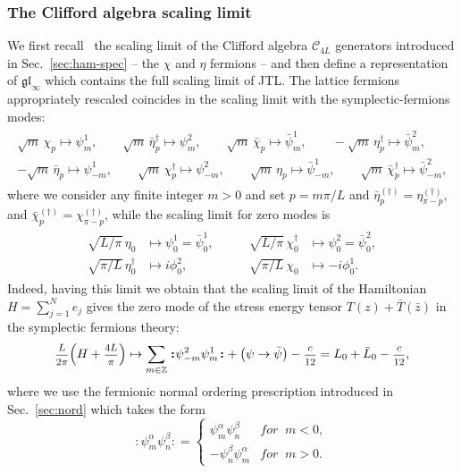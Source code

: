 \documentclass[11pt]{article}
\newcommand{\ffrac}[2]{\mbox{\footnotesize$\displaystyle\frac{#1}{#2}$}}
\newcommand{\bbeta}{\bar{\eta}}
\newcommand{\bbchi}{\bar{\chi}}
\newcommand{\sferm}{\psi}
\newcommand{\sfermp}{\psi^{2}}
\newcommand{\sfermm}{\psi^{1}}
\newcommand{\bsfermp}{\bar{\psi}^{2}}
\newcommand{\bsfermm}{\bar{\psi}^{1}}
\newcommand{\phip}{\phi^{2}}
\newcommand{\phim}{\phi^{1}}
\newcommand{\oZ}{\mathbb{Z}}
\newcommand{\Clif}[1]{\mathscr{C}_{#1}}
\newcommand{\glinf}{\gl_{\infty}}
\newcommand{\gl}{\mathfrak{gl}}
\newcommand{\bz}{\bar{z}}
\newcommand{\nord}[1]{\boldsymbol{\colon}\!\!{#1}\boldsymbol{\colon}\!\!}
\theoremstyle{definition}
\begin{document}
\subsubsection{The Clifford algebra scaling limit}\label{Cliff-def}
We first recall~\cite{GRS1} the scaling limit of the Clifford algebra $\Clif{4L}$ generators introduced in Sec.~\ref{sec:ham-spec} -- the $\chi$ and $\eta$
fermions --
and then define a representation of $\glinf$ which contains the full scaling limit of JTL.
The lattice fermions appropriately rescaled coincides in the scaling limit with the symplectic-fermions modes:
\begin{eqnarray}\label{eq:sferm-lat-def}
\begin{split}
\sqrt{m}\,\chi_p\mapsto\sfermm_m,\qquad\sqrt{m}
\,\bar{\eta}^\dagger_p\mapsto\sfermp_m,\qquad\sqrt{m}\,\bar{\chi}_p\mapsto\bsfermm_m,
\qquad-\sqrt{m}\,\eta^\dagger_p\mapsto\bsfermp_m,\\
-\sqrt{m}\,\bar{\eta}_p\mapsto\sfermm_{-m}, \qquad\sqrt{m}\,\chi^\dagger_p\mapsto\sfermp_{-m},
\qquad\sqrt{m}\,\eta_p\mapsto\bsfermm_{-m}, \qquad\sqrt{m}\,\bar{\chi}^\dagger_p\mapsto\bsfermp_{-m},
\end{split}
\end{eqnarray}
%
where we consider any finite integer $m>0$ and set $p=m\pi/L$ and  $\bbeta^{(\dagger)}_p=\eta^{(\dagger)}_{\pi-p}$, and
$\bbchi^{(\dagger)}_p=\chi^{(\dagger)}_{\pi-p}$, while  the scaling limit for zero modes is
\begin{eqnarray}\label{eq:sferm-zero-def}
\begin{split}
\sqrt{L/\pi}\,\eta_0&\mapsto \sfermm_0=\bsfermm_0,
&\qquad
 \sqrt{L/\pi}\,\chi_0^{\dagger}&\mapsto\sfermp_0=\bsfermp_0,\\
\sqrt{\pi/L}\,\eta^{\dagger}_{0}&\mapsto i\phip_0,& \qquad
\sqrt{\pi/L}\,\chi_{0}&\mapsto -i\phim_0.
\end{split}
\end{eqnarray}
Indeed, having this limit we obtain
 that the scaling limit of the Hamiltonian $H=\sum_{j=1}^N e_j$ gives the zero mode of the stress energy tensor $T(z)+\bar{T}(\bz)$ in the symplectic fermions theory:
%
\begin{equation}\label{L0-def}
\ffrac{L}{2\pi}\Bigl(H+\ffrac{4L}{\pi}\Bigr)\mapsto  \sum_{m\in\oZ}
\nord{\sfermp_{-m}\sfermm_m}+
\bigl(\psi\to\bar{\psi}\bigr)-\ffrac{c}{12} = L_0+\bar{L}_0-\ffrac{c}{12},
\end{equation}
where we use the  fermionic normal ordering prescription introduced in Sec.~\ref{sec:nord} which takes the form~\cite{Kausch}
\begin{equation}
\nord{\sferm^{\alpha}_{m}\sferm^{\beta}_n}
=\begin{cases}
\sferm^{\alpha}_{m}\sferm^{\beta}_n&\textit{for}\;\; m<0,\\
-\sferm^{\beta}_n\sferm^{\alpha}_{m}&\textit{for}\;\; m>0.
\end{cases}
\end{equation}
\end{document}
